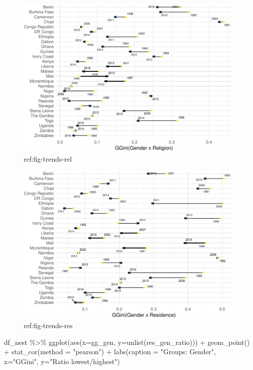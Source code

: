 \documentclass[
  11pt,
a4paper
]{article}
\newenvironment{Shaded}{\begin{snugshade}}{\end{snugshade}}
\newcommand{\AttributeTok}[1]{\textcolor[rgb]{0.77,0.63,0.00}{#1}}
\newcommand{\FunctionTok}[1]{\textcolor[rgb]{0.00,0.00,0.00}{#1}}
\newcommand{\NormalTok}[1]{#1}
\newcommand{\SpecialCharTok}[1]{\textcolor[rgb]{0.00,0.00,0.00}{#1}}
\newcommand{\StringTok}[1]{\textcolor[rgb]{0.31,0.60,0.02}{#1}}
\begin{document}
\begin{figure}
\includegraphics{horizontal_inequality_files/figure-latex/trends-rel-1} \caption[ref:fig-trends-rel]{ref:fig-trends-rel}\label{fig:trends-rel}
 \end{figure}




\begin{figure}
\includegraphics{horizontal_inequality_files/figure-latex/trends-res-1} \caption[ref:fig-trends-res]{ref:fig-trends-res}\label{fig:trends-res}
 \end{figure}

\begin{Shaded}
\begin{Highlighting}[]
\NormalTok{df\_nest }\SpecialCharTok{\%\textgreater{}\%} 
  \FunctionTok{ggplot}\NormalTok{(}\FunctionTok{aes}\NormalTok{(}\AttributeTok{x=}\NormalTok{gg\_gen, }\AttributeTok{y=}\FunctionTok{unlist}\NormalTok{(res\_gen\_ratio))) }\SpecialCharTok{+} 
  \FunctionTok{geom\_point}\NormalTok{() }\SpecialCharTok{+} 
  \FunctionTok{stat\_cor}\NormalTok{(}\AttributeTok{method =} \StringTok{"pearson"}\NormalTok{) }\SpecialCharTok{+}
  \FunctionTok{labs}\NormalTok{(}\AttributeTok{caption =} \StringTok{"Groups: Gender"}\NormalTok{, }\AttributeTok{x=}\StringTok{"GGini"}\NormalTok{, }\AttributeTok{y=}\StringTok{"Ratio lowest/highest"}\NormalTok{)}
\end{Highlighting}
\end{Shaded}
\end{document}
